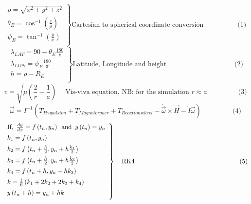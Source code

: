 \documentclass[11pt]{report}
\begin{document}
	\vspace{30pt}\noindent$$
	\left.
	\begin{array}{lll}
		\rho = \sqrt{x^2+y^2+z^2}\\
		\theta_E = \cos^{-1}\left(\frac{z}{\rho}\right)\\
		\psi_E = \tan^{-1}\left(\frac{y}{x}\right)\\
	\end{array}
	 \right \} \text{Cartesian to spherical coordinate conversion} \hspace{60pt}\text{(1)}
	$$	
	\vspace{25pt}\noindent$$
	\left.
	\begin{array}{lll}
		\lambda_{LAT} = 90-\theta_E\frac{180}{\pi}\\
		\lambda_{LON} = \psi_E\frac{180}{\pi}\\
		h = \rho-R_E\\
	\end{array}
	\right \} \text{Latitude, Longitude and height} \hspace{120pt}\text{(2)}
	$$
	\vspace{20pt}\noindent$$
	v = \sqrt{\mu\left(\frac{2}{r}-\frac{1}{a}\right)}\hspace{15pt}\text{Vis-viva equation, NB: for the simulation }r\approx a \hspace{55pt}\text{(3)}
	$$
	\vspace{20pt}\noindent$$
	\dot{\vec{\omega}} = I^{-1}\left(T_{Propulsion} + T_{Magnetorquer} + T_{Reactionwheel} - \dot{\vec{\omega}}\times\vec{H} - \dot{I}\vec{\omega}\right)\hspace{55pt}\text{(4)}
	$$
	\vspace{20pt}\noindent$$
	\left.
	\begin{array}{lll}
		\vspace{5pt}\text{If,}\hspace{5pt}\frac{dy}{dx} = f\left(t_n,y_n\right)\hspace{5pt}\text{and}\hspace{5pt}y\left(t_n\right) = y_n\\
		\vspace{5pt}k_1 = f\left(t_n,y_n\right)\\
		\vspace{5pt}k_2 = f\left(t_n + \frac{h}{2},y_n + h\frac{k_1}{2}\right)\\
		\vspace{5pt}k_3 = f\left(t_n + \frac{h}{2},y_n + h\frac{k_2}{2}\right)\\
		\vspace{5pt}k_4 = f\left(t_n + h,y_n + hk_3\right)\\
		\vspace{5pt}k = \frac{1}{6}\left(k_1 + 2k_2 + 2k_3 + k_4\right)\\
		\vspace{5pt}y\left(t_n + h\right) = y_n + hk\\
	\end{array}
	\right \} \hspace{10pt}\text{RK4}\hspace{164pt}\text{(5)}
	$$
\end{document}
